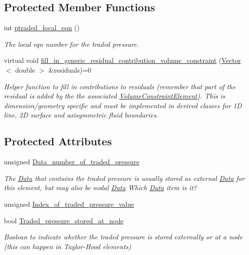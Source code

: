 \subsection*{Protected Member Functions}
\begin{DoxyCompactItemize}
\item 
int \hyperlink{classoomph_1_1VolumeConstraintBoundingElement_ae5262edeb9cd3bcbc1ae4265b08c7f07}{ptraded\+\_\+local\+\_\+eqn} ()
\begin{DoxyCompactList}\small\item\em The local eqn number for the traded pressure. \end{DoxyCompactList}\item 
virtual void \hyperlink{classoomph_1_1VolumeConstraintBoundingElement_a717f1085709bd8820b8043ff94ecb0c5}{fill\+\_\+in\+\_\+generic\+\_\+residual\+\_\+contribution\+\_\+volume\+\_\+constraint} (\hyperlink{classoomph_1_1Vector}{Vector}$<$ double $>$ \&residuals)=0
\begin{DoxyCompactList}\small\item\em Helper function to fill in contributions to residuals (remember that part of the residual is added by the the associated \hyperlink{classoomph_1_1VolumeConstraintElement}{Volume\+Constraint\+Element}). This is dimension/geometry specific and must be implemented in derived classes for 1D line, 2D surface and axisymmetric fluid boundaries. \end{DoxyCompactList}\end{DoxyCompactItemize}
\subsection*{Protected Attributes}
\begin{DoxyCompactItemize}
\item 
unsigned \hyperlink{classoomph_1_1VolumeConstraintBoundingElement_afd35462188f27b6851416ab49ec5df5a}{Data\+\_\+number\+\_\+of\+\_\+traded\+\_\+pressure}
\begin{DoxyCompactList}\small\item\em The \hyperlink{classoomph_1_1Data}{Data} that contains the traded pressure is usually stored as external \hyperlink{classoomph_1_1Data}{Data} for this element, but may also be nodal \hyperlink{classoomph_1_1Data}{Data} Which \hyperlink{classoomph_1_1Data}{Data} item is it? \end{DoxyCompactList}\item 
unsigned \hyperlink{classoomph_1_1VolumeConstraintBoundingElement_a40f5ebebeaf633515951a2d08060ec15}{Index\+\_\+of\+\_\+traded\+\_\+pressure\+\_\+value}
\item 
bool \hyperlink{classoomph_1_1VolumeConstraintBoundingElement_a8f9aa94f106fd443fa690851a0268720}{Traded\+\_\+pressure\+\_\+stored\+\_\+at\+\_\+node}
\begin{DoxyCompactList}\small\item\em Boolean to indicate whether the traded pressure is stored externally or at a node (this can happen in Taylor-\/\+Hood elements) \end{DoxyCompactList}\end{DoxyCompactItemize}
